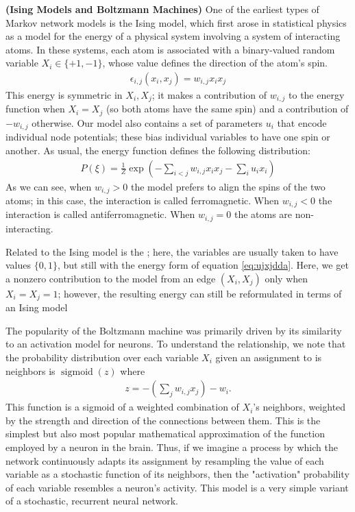 \documentclass{article}
\newcommand{\bfs}[1]{\textbf{({#1}) }}
\begin{document}
\begin{exma}\bfs{Ising Models and Boltzmann Machines}
One of the earliest types of Markov network models is the Ising model, which first arose in statistical physics as a model for the energy of a physical system involving a system of interacting atoms. In these systems, each atom is associated with a binary-valued random variable $X_{i} \in\{+1,-1\}$, whose value defines the direction of the atom's spin. 
\begin{align}
\epsilon_{i, j}\left(x_{i}, x_{j}\right)=w_{i, j} x_{i} x_{j}\label{eq:ujxjdda}
\end{align}
This energy is symmetric in $X_{i}, X_{j}$; it makes a contribution of $w_{i, j}$ to the energy function when $X_{i}=X_{j}$ (so both atoms have the same spin) and a contribution of $-w_{i, j}$ otherwise. Our model also contains a set of parameters $u_{i}$ that encode individual node potentials; these bias individual variables to have one spin or another.
As usual, the energy function defines the following distribution:
\begin{align*}
P(\xi)=\frac{1}{Z} \exp \left(-\sum_{i<j} w_{i, j} x_{i} x_{j}-\sum_{i} u_{i} x_{i}\right)
\end{align*}
As we can see, when $w_{i, j}>0$ the model prefers to align the spins of the two atoms; in this case, the interaction is called ferromagnetic. When $w_{i, j}<0$ the interaction is called antiferromagnetic. When $w_{i, j}=0$ the atoms are non-interacting.


Related to the Ising model is the ; here, the variables are usually taken to have values $\{0,1\}$, but still with the energy form of equation \cref{eq:ujxjdda}. Here, we get a nonzero contribution to the model from an edge $\left(X_{i}, X_{j}\right)$ only when $X_{i}=X_{j}=1$; however, the resulting energy can still be reformulated in terms of an Ising model 

The popularity of the Boltzmann machine was primarily driven by its similarity to an activation model for neurons. To understand the relationship, we note that the probability distribution over each variable $X_{i}$ given an assignment to is neighbors is $\operatorname{sigmoid}(z)$ where
\begin{align*}
z=-\left(\sum_j w_{i, j} x_{j}\right)-w_{i} .
\end{align*}
This function is a sigmoid of a weighted combination of $X_{i}$'s neighbors, weighted by the strength and direction of the connections between them. This is the simplest but also most popular mathematical approximation of the function employed by a neuron in the brain. Thus, if we imagine a process by which the network continuously adapts its assignment by resampling the value of each variable as a stochastic function of its neighbors, then the "activation" probability of each variable resembles a neuron's activity. This model is a very simple variant of a stochastic, recurrent neural network.
\end{exma}
\end{document}

